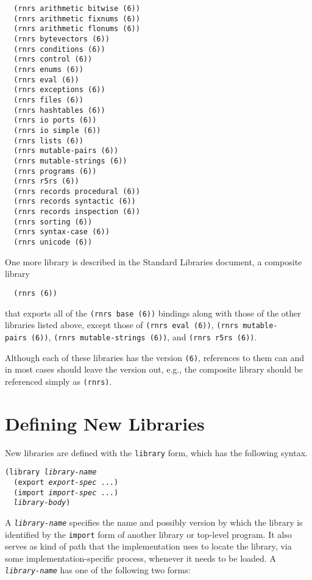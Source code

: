 \begin{alltt}
  (rnrs arithmetic bitwise (6))
  (rnrs arithmetic fixnums (6))
  (rnrs arithmetic flonums (6))
  (rnrs bytevectors (6))
  (rnrs conditions (6))
  (rnrs control (6))
  (rnrs enums (6))
  (rnrs eval (6))
  (rnrs exceptions (6))
  (rnrs files (6))
  (rnrs hashtables (6))
  (rnrs io ports (6))
  (rnrs io simple (6))
  (rnrs lists (6))
  (rnrs mutable-pairs (6))
  (rnrs mutable-strings (6))
  (rnrs programs (6))
  (rnrs r5rs (6))
  (rnrs records procedural (6))
  (rnrs records syntactic (6))
  (rnrs records inspection (6))
  (rnrs sorting (6))
  (rnrs syntax-case (6))
  (rnrs unicode (6))
\end{alltt}


One more library is described in the Standard Libraries document, a
composite library


\texttt{  (rnrs (6))}

that exports all of the
\texttt{(rnrs base (6))} bindings along with those of
the other libraries listed above, except those of
\texttt{(rnrs eval (6))}, \texttt{(rnrs mutable-pairs (6))},
\texttt{(rnrs mutable-strings (6))}, and \texttt{(rnrs r5rs (6))}.


Although each of these libraries has the version \texttt{(6)},
references to them can and in most cases should leave the version
out, e.g., the composite library should be referenced simply
as \texttt{(rnrs)}.


\section{\label{libraries_g144}\label{libraries_h2}Defining New Libraries}



New libraries are defined with the \texttt{library} form, which has
the following syntax.


\begin{alltt}
(library \textit{library-name}
  (export \textit{export-spec} ...)
  (import \textit{import-spec} ...)
  \textit{library-body})
\end{alltt}


A \texttt{\textit{library-name}} specifies the name and possibly version by which the
library is identified by the \texttt{import} form of another library or
top-level program.
It also serves as kind of path that the implementation uses to locate the
library, via some implementation-specific process, whenever it needs to be
loaded.
A \texttt{\textit{library-name}} has one of the following two forms:


